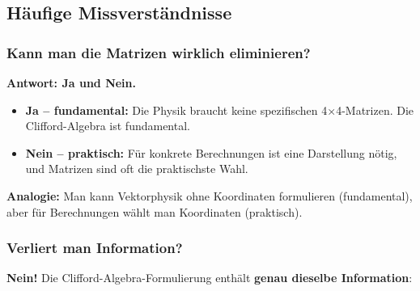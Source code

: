 \subsection{Häufige Missverständnisse}
\label{subsec:common_misconceptions}

\subsubsection{Kann man die Matrizen wirklich eliminieren?}

\textbf{Antwort: Ja und Nein.}

\begin{itemize}
	\item \textbf{Ja -- fundamental:} Die Physik braucht keine spezifischen 
	4×4-Matrizen. Die Clifford-Algebra ist fundamental.
	
	\item \textbf{Nein -- praktisch:} Für konkrete Berechnungen ist eine Darstellung 
	nötig, und Matrizen sind oft die praktischste Wahl.
\end{itemize}

\textbf{Analogie:} Man kann Vektorphysik ohne Koordinaten formulieren (fundamental), 
aber für Berechnungen wählt man Koordinaten (praktisch).

\subsubsection{Verliert man Information?}

\textbf{Nein!} Die Clifford-Algebra-Formulierung enthält \textbf{genau dieselbe 
	Information}:

\begin{table}[h]
	\centering
	\caption{Information in beiden Formulierungen identisch}
\end{table}

